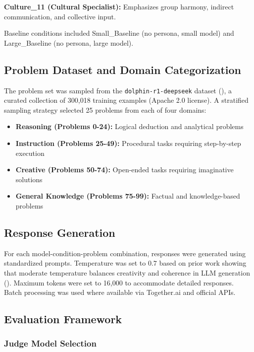 \documentclass{article}
\begin{document}
\textbf{Culture\_11 (Cultural Specialist):} Emphasizes group harmony, indirect communication, and collective input.

Baseline conditions included Small\_Baseline (no persona, small model) and Large\_Baseline (no persona, large model).

\subsection{Problem Dataset and Domain Categorization}

The problem set was sampled from the \texttt{dolphin-r1-deepseek} dataset (\cite{dolphin2024}), a curated collection of 300,018 training examples (Apache 2.0 license). A stratified sampling strategy selected 25 problems from each of four domains:

\begin{itemize}
    \item \textbf{Reasoning (Problems 0-24):} Logical deduction and analytical problems
    \item \textbf{Instruction (Problems 25-49):} Procedural tasks requiring step-by-step execution
    \item \textbf{Creative (Problems 50-74):} Open-ended tasks requiring imaginative solutions
    \item \textbf{General Knowledge (Problems 75-99):} Factual and knowledge-based problems
\end{itemize}

\subsection{Response Generation}

For each model-condition-problem combination, responses were generated using standardized prompts. Temperature was set to $0.7$ based on prior work showing that moderate temperature balances creativity and coherence in LLM generation (\cite{yuqing_bai_9d1d72ff}). Maximum tokens were set to 16,000 to accommodate detailed responses. Batch processing was used where available via Together.ai and official APIs.

\subsection{Evaluation Framework}

\subsubsection{Judge Model Selection}
\end{document}
